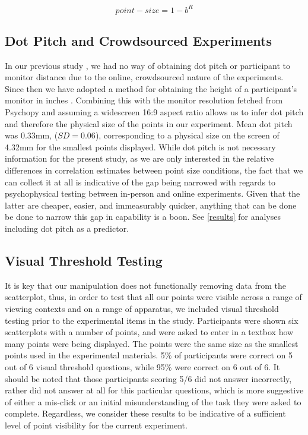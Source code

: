 \documentclass{vgtc}                          %
\begin{document}
\begin{equation}
  point-size = 1 - b^R
\end{equation}

\hypertarget{dot-pitch-and-crowdsourced-experiments}{%
\subsection{Dot Pitch and Crowdsourced Experiments}\label{dot-pitch-and-crowdsourced-experiments}}

In our previous study \cite{strain_2023}, we had no way of obtaining dot pitch
or participant to monitor distance due to the online, crowdsourced nature of the
experiments. Since then we have adopted a method for obtaining the height of a
participant's monitor in inches \cite{screenscale}. Combining this with the
monitor resolution fetched from Psychopy and assuming a widescreen 16:9 aspect ratio
allows us to infer dot pitch and therefore the physical size of the points in our
experiment. Mean dot pitch was 0.33mm, (\(SD = 0.06\)),
corresponding to a physical size on the screen of 4.32mm
for the smallest points displayed. While dot pitch is not necessary information for the present study, as we are only
interested in the relative differences in correlation estimates between point size
conditions, the fact that we can collect it at all is indicative of the gap
being narrowed with regards to psychophysical testing between in-person and online
experiments. Given that the latter are cheaper, easier, and immeasurably quicker,
anything that can be done be done to narrow this gap in capability is a boon.
See \autoref{results} for analyses including dot pitch as a predictor.

\hypertarget{visual-threshold-testing}{%
\subsection{Visual Threshold Testing}\label{visual-threshold-testing}}

It is key that our manipulation does not functionally removing data from the scatterplot,
thus, in order to test that all our points were visible across a range of viewing
contexts and on a range of apparatus, we included visual threshold testing prior
to the experimental items in the study. Participants were shown six scatterplots
with a number of points, and were asked to enter in a textbox how many points
were being displayed. The points were the same size as the smallest points used
in the experimental materials. 5\% of
participants were correct on 5 out of 6 visual
threshold questions, while 95\% were correct
on 6 out of 6. It should be noted that those
participants scoring 5/6 did not answer incorrectly, rather did not answer
at all for this particular questions, which is more suggestive of either
a mis-click or an initial misunderstanding of the task they were asked to complete.
Regardless, we consider these results to be indicative of a sufficient level of
point visibility for the current experiment.
\end{document}
